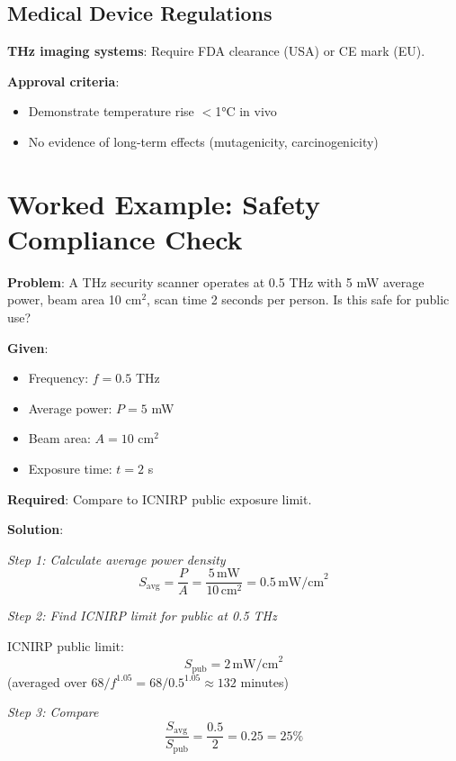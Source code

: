 \subsection{Medical Device Regulations}

\textbf{THz imaging systems}: Require FDA clearance (USA) or CE mark (EU).

\textbf{Approval criteria}:
\begin{itemize}
\item Demonstrate temperature rise $<$1°C in vivo
\item No evidence of long-term effects (mutagenicity, carcinogenicity)
\end{itemize}

\section{Worked Example: Safety Compliance Check}

\textbf{Problem}: A THz security scanner operates at 0.5 THz with 5 mW average power, beam area 10 cm$^2$, scan time 2 seconds per person. Is this safe for public use?

\textbf{Given}:
\begin{itemize}
\item Frequency: $f = 0.5$ THz
\item Average power: $P = 5$ mW
\item Beam area: $A = 10$ cm$^2$
\item Exposure time: $t = 2$ s
\end{itemize}

\textbf{Required}: Compare to ICNIRP public exposure limit.

\textbf{Solution}:

\textit{Step 1: Calculate average power density}
\begin{equation}
S_{\text{avg}} = \frac{P}{A} = \frac{5\,\text{mW}}{10\,\text{cm}^2} = 0.5\,\text{mW/cm}^2
\end{equation}

\textit{Step 2: Find ICNIRP limit for public at 0.5 THz}

ICNIRP public limit:
\begin{equation}
S_{\text{pub}} = 2\,\text{mW/cm}^2
\end{equation}
(averaged over $68/f^{1.05} = 68/0.5^{1.05} \approx 132$ minutes)

\textit{Step 3: Compare}
\begin{equation}
\frac{S_{\text{avg}}}{S_{\text{pub}}} = \frac{0.5}{2} = 0.25 = 25\%
\end{equation}

